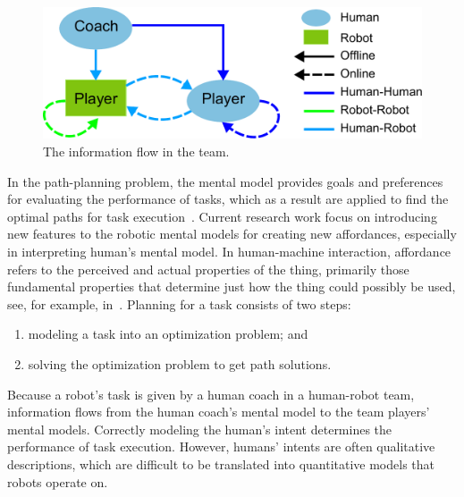 \documentclass[phd]{byuprop}
\begin{document}
\begin{figure}[hbtp]
\centering
\includegraphics[width=0.6\linewidth]{./fig/team_info_flow.pdf}
\caption{The information flow in the team.}
\label{fig:team_info_flow}
\end{figure}

In the path-planning problem, the mental model provides goals and preferences for evaluating the performance of tasks, which as a result are applied to find the optimal paths for task execution~\cite{choset2005principles}.
Current research work focus on introducing new features to the robotic mental models for creating new affordances, especially in interpreting human's mental model.
In human-machine interaction, affordance refers to the perceived and actual properties of the thing, primarily those fundamental properties that determine just how the thing could possibly be used, see, for example, in~\cite{norman2013design}.
Planning for a task consists of two steps:
\begin{enumerate}
\item modeling a task into an optimization problem; and
\item solving the optimization problem to get path solutions.
\end{enumerate}
Because a robot's task is given by a human coach in a human-robot team, information flows from the human coach's mental model to the team players' mental models.
Correctly modeling the human's intent determines the performance of task execution.
However, humans' intents are often qualitative descriptions, which are difficult to be translated into quantitative models that robots operate on.
\end{document}
